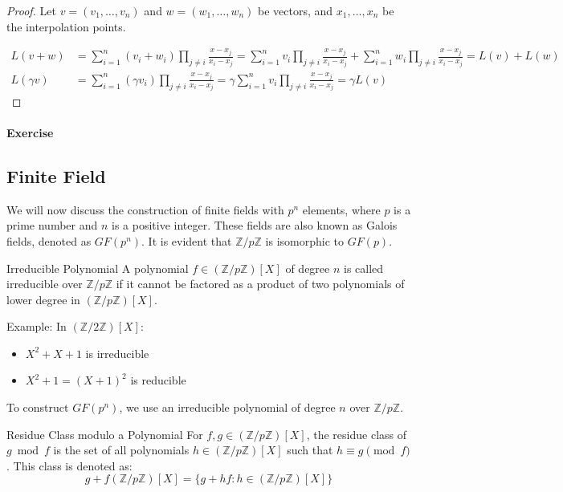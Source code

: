 \documentclass{article}
\begin{document}
\begin{proof}
    
Let $v = (v_1, \ldots, v_n)$ and $w = (w_1, \ldots, w_n)$ be vectors, and $x_1, \ldots, x_n$ be the interpolation points.

\begin{align*}
    L(v + w) &= \sum_{i=1}^n (v_i + w_i) \prod_{j \neq i} \frac{x - x_j}{x_i - x_j} = \sum_{i=1}^n v_i \prod_{j \neq i} \frac{x - x_j}{x_i - x_j} + \sum_{i=1}^n w_i \prod_{j \neq i} \frac{x - x_j}{x_i - x_j} = L(v) + L(w) \\
    L(\gamma v) &= \sum_{i=1}^n (\gamma v_i) \prod_{j \neq i} \frac{x - x_j}{x_i - x_j} = \gamma \sum_{i=1}^n v_i \prod_{j \neq i} \frac{x - x_j}{x_i - x_j} = \gamma L(v)
\end{align*}
\end{proof}

\paragraph{Exercise}

\subsection{Finite Field}

We will now discuss the construction of finite fields with $p^n$ elements, where $p$ is a prime number and $n$ is a positive integer. These fields are also known as Galois fields, denoted as $GF(p^n)$. It is evident that $\mathbb{Z}/p\mathbb{Z}$ is isomorphic to $GF(p)$.


\begin{definition}{Irreducible Polynomial}{}
A polynomial $f \in (\mathbb{Z}/p\mathbb{Z})[X]$ of degree $n$ is called irreducible over $\mathbb{Z}/p\mathbb{Z}$ if it cannot be factored as a product of two polynomials of lower degree in $(\mathbb{Z}/p\mathbb{Z})[X]$.
\end{definition}

Example: In $(\mathbb{Z}/2\mathbb{Z})[X]$:
\begin{itemize}
    \item $X^2 + X + 1$ is irreducible
    \item $X^2 + 1 = (X + 1)^2$ is reducible
\end{itemize}

To construct $GF(p^n)$, we use an irreducible polynomial of degree $n$ over $\mathbb{Z}/p\mathbb{Z}$.

\begin{definition}{Residue Class modulo a Polynomial}{}
For $f, g \in (\mathbb{Z}/p\mathbb{Z})[X]$, the residue class of $g \bmod f$ is the set of all polynomials $h \in (\mathbb{Z}/p\mathbb{Z})[X]$ such that $h \equiv g \pmod{f}$. This class is denoted as:
\[ g + f(\mathbb{Z}/p\mathbb{Z})[X] = \{g + hf : h \in (\mathbb{Z}/p\mathbb{Z})[X]\} \]
\end{definition}
\end{document}
